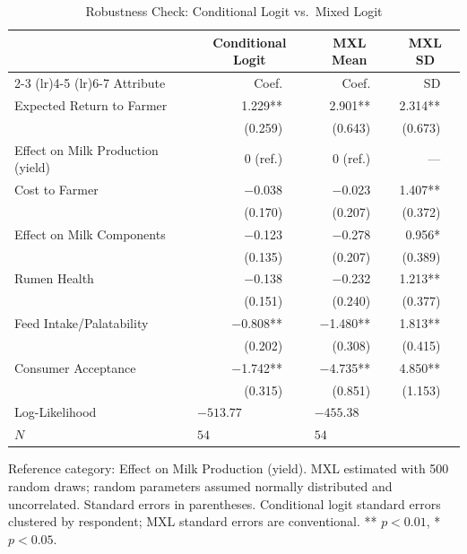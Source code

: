 \begin{table}[H]
\centering
\caption{Robustness Check: Conditional Logit vs.\ Mixed Logit}
\label{tab:bws_mxl}
\begin{threeparttable}
\begin{tabular}{lrlrlrl}
\toprule
 & \multicolumn{2}{c}{Conditional Logit} & \multicolumn{2}{c}{MXL Mean} & \multicolumn{2}{c}{MXL SD} \\
\cmidrule(lr){2-3} \cmidrule(lr){4-5} \cmidrule(lr){6-7}
Attribute & Coef. & & Coef. & & SD & \\
\midrule
Expected Return to Farmer & 1.229** & & 2.901** & & 2.314** & \\
 & {\small (0.259)} & & {\small (0.643)} & & {\small (0.673)} & \\
\addlinespace[4pt]
Effect on Milk Production (yield) & 0 (ref.) & & 0 (ref.) & & --- & \\
\addlinespace[4pt]
Cost to Farmer & $-$0.038 & & $-$0.023 & & 1.407** & \\
 & {\small (0.170)} & & {\small (0.207)} & & {\small (0.372)} & \\
\addlinespace[4pt]
Effect on Milk Components & $-$0.123 & & $-$0.278 & & 0.956* & \\
 & {\small (0.135)} & & {\small (0.207)} & & {\small (0.389)} & \\
\addlinespace[4pt]
Rumen Health & $-$0.138 & & $-$0.232 & & 1.213** & \\
 & {\small (0.151)} & & {\small (0.240)} & & {\small (0.377)} & \\
\addlinespace[4pt]
Feed Intake/Palatability & $-$0.808** & & $-$1.480** & & 1.813** & \\
 & {\small (0.202)} & & {\small (0.308)} & & {\small (0.415)} & \\
\addlinespace[4pt]
Consumer Acceptance & $-$1.742** & & $-$4.735** & & 4.850** & \\
 & {\small (0.315)} & & {\small (0.851)} & & {\small (1.153)} & \\
\midrule
Log-Likelihood & \multicolumn{2}{l}{$-513.77$} & \multicolumn{2}{l}{$-455.38$} & & \\
$N$ & \multicolumn{2}{l}{$54$} & \multicolumn{2}{l}{$54$} & & \\
\bottomrule
\end{tabular}
\begin{tablenotes}[flushleft]
\footnotesize
\item Reference category: Effect on Milk Production (yield). MXL estimated with 500 random draws; random parameters assumed normally distributed and uncorrelated. Standard errors in parentheses. Conditional logit standard errors clustered by respondent; MXL standard errors are conventional. ** $p < 0.01$, * $p < 0.05$.
\end{tablenotes}
\end{threeparttable}
\end{table}

